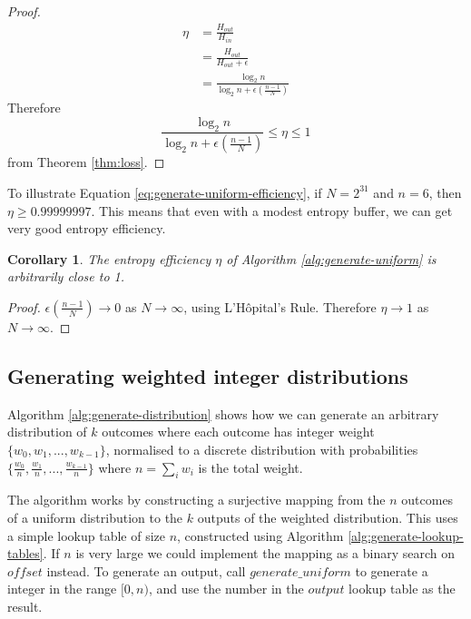 \documentclass[12pt]{article}
\newtheorem{corollary}{Corollary}
\begin{document}
\begin{proof}
\begin{align}
    \eta & = \frac{H_{out}}{H_{in}} \\
         & = \frac{H_{out}}{H_{out}+\epsilon} \\
         & = \frac{\log_2n}{\log_2n + \epsilon(\frac{n-1}{N})}
\end{align}
Therefore 
\begin{equation}
\frac{\log_2n}{\log_2n + \epsilon(\frac{n-1}{N})} \le \eta \le 1
\end{equation}
from Theorem \ref{thm:loss}.
\end{proof}

To illustrate Equation \ref{eq:generate-uniform-efficiency}, if $N=2^{31}$ and $n=6$, then $\eta \ge 0.99999997$. This means that even with a modest entropy buffer, we can get very good entropy efficiency.

\begin{corollary}
The entropy efficiency $\eta$ of Algorithm \ref{alg:generate-uniform} is arbitrarily close to 1.
\end{corollary}

\begin{proof}
$\epsilon(\frac{n-1}{N}) \rightarrow 0$ as $N \rightarrow \infty$, using L'H\^opital's Rule. Therefore $\eta \rightarrow 1$ as $N \rightarrow \infty$.
\end{proof}






\subsection{Generating weighted integer distributions}

Algorithm \ref{alg:generate-distribution} shows how we can generate an arbitrary  distribution of $k$ outcomes where each outcome has integer weight $\{w_0, w_1, ..., w_{k-1}\}$, normalised to a discrete distribution with probabilities $\{\frac{w_0}{n}, \frac{w_1}{n}, ..., \frac{w_{k-1}}{n}\}$ where $n=\sum_i w_i$ is the total weight.

The algorithm works by constructing a surjective mapping from the $n$ outcomes of a uniform distribution to the $k$ outputs of the weighted distribution. This uses a simple lookup table of size $n$, constructed using Algorithm \ref{alg:generate-lookup-tables}. If $n$ is very large we could implement the mapping as a binary search on $offset$ instead. To generate an output, call $generate\_uniform$ to generate a integer in the range $[0,n)$, and use the number in the $output$ lookup table as the result. 
\end{document}
